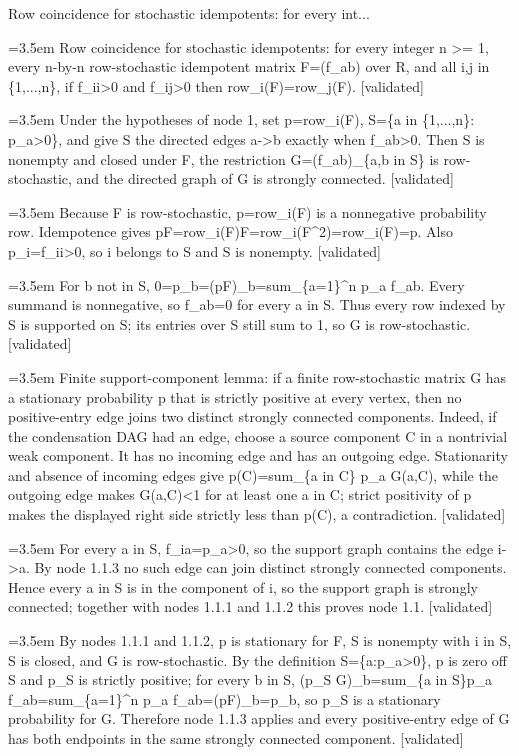 \documentclass{article}
\newcommand{\step}[1]{\par\noindent\hangindent=3.5em\hangafter=1%
  \makebox[3.5em][l]{\textbf{#1.}}}
\newcommand{\steptag}[1]{\hfill{\small\textsf{[#1]}}}
\begin{document}
\begin{proofbox}{Row coincidence for stochastic idempotents: for every int...}
\step{1} Row coincidence for stochastic idempotents: for every integer n >= 1, every n-by-n row-stochastic idempotent matrix F=(f\_ab) over R, and all i,j in \{1,...,n\}, if f\_ii>0 and f\_ij>0 then row\_i(F)=row\_j(F). \steptag{validated} \\[6pt]
\step{1.1} Under the hypotheses of node 1, set p=row\_i(F), S=\{a in \{1,...,n\}: p\_a>0\}, and give S the directed edges a->b exactly when f\_ab>0. Then S is nonempty and closed under F, the restriction G=(f\_ab)\_\{a,b in S\} is row-stochastic, and the directed graph of G is strongly connected. \steptag{validated} \\[6pt]
\step{1.1.1} Because F is row-stochastic, p=row\_i(F) is a nonnegative probability row. Idempotence gives pF=row\_i(F)F=row\_i(F\textasciicircum{}2)=row\_i(F)=p. Also p\_i=f\_ii>0, so i belongs to S and S is nonempty. \steptag{validated} \\[4pt]
\step{1.1.2} For b not in S, 0=p\_b=(pF)\_b=sum\_\{a=1\}\textasciicircum{}n p\_a f\_ab. Every summand is nonnegative, so f\_ab=0 for every a in S. Thus every row indexed by S is supported on S; its entries over S still sum to 1, so G is row-stochastic. \steptag{validated} \\[4pt]
\step{1.1.3} Finite support-component lemma: if a finite row-stochastic matrix G has a stationary probability p that is strictly positive at every vertex, then no positive-entry edge joins two distinct strongly connected components. Indeed, if the condensation DAG had an edge, choose a source component C in a nontrivial weak component. It has no incoming edge and has an outgoing edge. Stationarity and absence of incoming edges give p(C)=sum\_\{a in C\} p\_a G(a,C), while the outgoing edge makes G(a,C)<1 for at least one a in C; strict positivity of p makes the displayed right side strictly less than p(C), a contradiction. \steptag{validated} \\[4pt]
\step{1.1.4} For every a in S, f\_ia=p\_a>0, so the support graph contains the edge i->a. By node 1.1.3 no such edge can join distinct strongly connected components. Hence every a in S is in the component of i, so the support graph is strongly connected; together with nodes 1.1.1 and 1.1.2 this proves node 1.1. \steptag{validated} \\[6pt]
\step{1.1.4.1} By nodes 1.1.1 and 1.1.2, p is stationary for F, S is nonempty with i in S, S is closed, and G is row-stochastic. By the definition S=\{a:p\_a>0\}, p is zero off S and p\_S is strictly positive; for every b in S, (p\_S G)\_b=sum\_\{a in S\}p\_a f\_ab=sum\_\{a=1\}\textasciicircum{}n p\_a f\_ab=(pF)\_b=p\_b, so p\_S is a stationary probability for G. Therefore node 1.1.3 applies and every positive-entry edge of G has both endpoints in the same strongly connected component. \steptag{validated} \\[4pt]

\end{proofbox}
\end{document}

